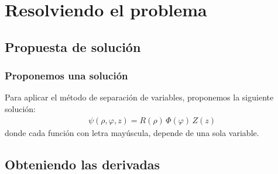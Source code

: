 \documentclass[12pt]{beamer}
\begin{document}
\section{Resolviendo el problema}
\subsection{Propuesta de solución}

\begin{frame}
\frametitle{Proponemos una solución}
Para aplicar el método de separación de variables, proponemos la siguiente solución:
\begin{align*}
\psi (\rho, \varphi, z) = R(\rho) \, \Phi (\varphi) \, Z(z)
\end{align*}
\pause
donde cada función con letra mayúscula, depende de una sola variable.
\end{frame}

\subsection{Obteniendo las derivadas}
\end{document}
